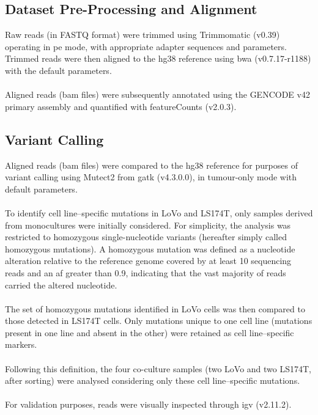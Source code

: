 \subsection{Dataset Pre-Processing and Alignment}

Raw reads (in FASTQ format) were trimmed using Trimmomatic (v0.39)\cite{bolger_trimmomatic_2014} operating in \gls{pe} mode, with appropriate adapter sequences and parameters. Trimmed reads were then aligned to the \gls{hg38} reference using \gls{bwa} (v0.7.17-r1188)\cite{li_fast_2009} with the default parameters.
\\
\\
Aligned reads (\gls{bam} files) were subsequently annotated using the GENCODE v42 primary assembly\cite{frankish_gencode_2021} and quantified with featureCounts (v2.0.3)\cite{liao_featurecounts_2014}. 

\subsection{Variant Calling}

Aligned reads (\gls{bam} files) were compared to the \gls{hg38} reference for purposes of variant calling using Mutect2\cite{benjamin_calling_2019} from \gls{gatk}\cite{van_der_auwera_genomics_2020} (v4.3.0.0), in tumour-only mode with default parameters.
\\
\\
To identify cell line–specific mutations in LoVo and LS174T, only samples derived from monocultures were initially considered. For simplicity, the analysis was restricted to homozygous single-nucleotide variants (hereafter simply called homozygous mutations). A homozygous mutation was defined as a nucleotide alteration relative to the reference genome covered by at least 10 sequencing reads and an \gls{af} greater than 0.9, indicating that the vast majority of reads carried the altered nucleotide.
\\
\\
The set of homozygous mutations identified in LoVo cells was then compared to those detected in LS174T cells. Only mutations unique to one cell line (mutations present in one line and absent in the other) were retained as cell line–specific markers.
\\
\\
Following this definition, the four co-culture samples (two LoVo and two LS174T, after sorting) were analysed considering only these cell line–specific mutations. 
\\
\\
For validation purposes, reads were visually inspected through \gls{igv}\cite{robinson_variant_2017} (v2.11.2).

